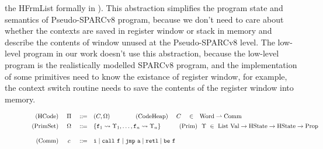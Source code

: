 \begin{itemize}
    the HFrmList formally in \Fig{\ref{fig:machine-state-concur-pseudo-sparc}}). 
    This abstraction simplifies 
    the program state and semantics of Pseudo-SPARCv8
    program, because we don't need to care about whether the 
    contexts are saved in register window or 
    stack in memory and describe the contents of window unused 
    at the Pseudo-SPARCv8 level. 
    The low-level program in our work doesn't use this 
    abstraction, because the low-level program 
    is the realistically modelled SPARCv8 program, 
    and the implementation of some primitives 
    need to know the existance of register window,  
    for example, the context switch routine 
    needs to save the contents 
    of the register window into memory.
\end{itemize}

\begin{figure*}[!t]
    \centering
    \vspace{-2em}
    \[
        \begin{array}{rcclcrccl}
            \TYPE{(HCode)} & \ \HMd \ & \define & (\code, \hprimset) & & 
            \qquad\,
            \TYPE{(CodeHeap)} & \ \code \ & \in & \TYPE{Word} \rightharpoonup \TYPE{Comm} 
            \\
            \\[-8pt]
            \TYPE{(PrimSet)} & \hprimset & \define & 
            \multicolumn{6}{l}
                {
                    \{ \lab{1} \rightsquigarrow \hprim_1, \dots, \lab{n} \rightsquigarrow \hprim_n \}
                    \qquad\quad
                    \TYPE{(Prim)} \ \ \hprim \ \in \ 
                    \TYPE{List} \ \TYPE{Val} \rightarrow \TYPE{HState} \rightarrow 
                    \TYPE{HState} \rightarrow \TYPE{Prop}            
                }  \\
            \\
            \TYPE{(Comm)} & \comm & \define & 
            \multicolumn{6}{l}
            {
                \simplins{} \sepline \call{} \ \lab{} 
                \sepline \jmp{} \ \aexp \sepline \retl \sepline \be{} \ \lab{}
}
\end{array}\]
\end{figure*}
